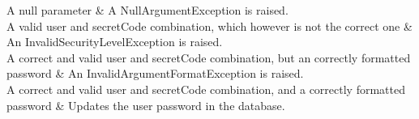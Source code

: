 \begin{testtable}
	A null parameter &
	A NullArgumentException is raised.\\\hline
	A valid user and secretCode combination, which however is not the correct one &
	An InvalidSecurityLevelException is raised. \\\hline
	A correct and valid user and secretCode combination, but an correctly formatted password &
	An InvalidArgumentFormatException is raised. \\\hline
	A correct and valid user and secretCode combination, and a correctly formatted password &
	Updates the user password in the database. \\\dline
	

	
\end{testtable}

